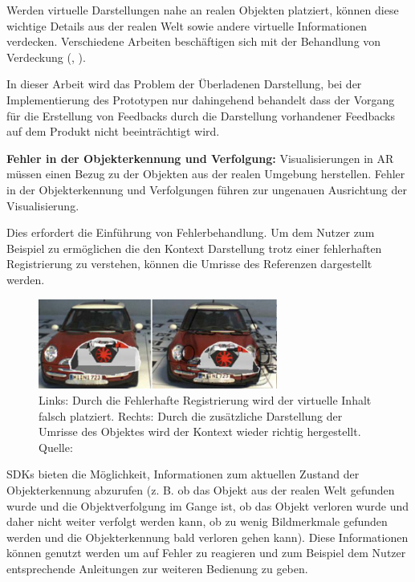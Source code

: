 Werden virtuelle Darstellungen nahe an realen Objekten platziert, können diese wichtige Details aus der realen Welt sowie andere virtuelle Informationen verdecken. 
Verschiedene Arbeiten beschäftigen sich mit der Behandlung von Verdeckung (\cite{Grasset2012}, \cite{Bell2001}).

In dieser Arbeit wird das Problem der Überladenen Darstellung, bei der Implementierung des Prototypen nur dahingehend behandelt dass der Vorgang für die Erstellung von 
Feedbacks durch die Darstellung vorhandener Feedbacks auf dem Produkt nicht beeinträchtigt wird. 

\textbf{Fehler in der Objekterkennung und Verfolgung:} Visualisierungen in AR müssen einen Bezug zu der Objekten aus der realen Umgebung herstellen. Fehler
in der Objekterkennung und Verfolgungen führen zur ungenauen Ausrichtung der Visualisierung.%

Dies erfordert die Einführung von Fehlerbehandlung. \cite[S.~243]{DieterSchmalstieg2016} Um dem Nutzer zum Beispiel zu ermöglichen die den Kontext Darstellung trotz einer fehlerhaften 
Registrierung zu verstehen, können die Umrisse des Referenzen dargestellt werden.

\begin{figure}[H]
	\centering
	\includegraphics[width=0.7\textwidth]{resources/fundamentals/missallignement.png}
	\caption{Links: Durch die Fehlerhafte Registrierung wird der virtuelle Inhalt falsch platziert. Rechts: Durch die zusätzliche Darstellung der Umrisse des Objektes wird der Kontext wieder richtig hergestellt. Quelle: \cite[S.~243]{DieterSchmalstieg2016}}
	\label{img:missallignement}
\end{figure}

SDKs bieten die Möglichkeit, Informationen zum aktuellen Zustand der Objekterkennung abzurufen (z. B. ob das Objekt aus der realen Welt gefunden wurde und die Objektverfolgung im Gange ist, ob das Objekt verloren wurde und daher nicht weiter verfolgt werden kann, ob zu wenig Bildmerkmale gefunden werden und die Objekterkennung bald verloren gehen kann). 
Diese Informationen können genutzt werden um auf Fehler zu reagieren und zum Beispiel dem Nutzer entsprechende Anleitungen zur weiteren Bedienung zu geben.


